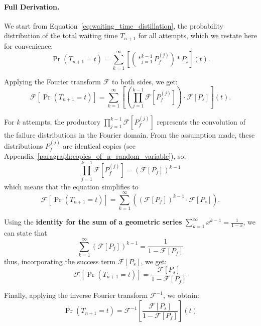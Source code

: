 \documentclass{masterthesis}
\begin{document}
\paragraph*{Full Derivation.}

We start from Equation~\ref{eq:waiting_time_distillation}, the probability distribution of the total waiting time \( T_{n+1} \) for all attempts, which we restate here for convenience:
\begin{equation}
    \Pr(T_{n+1} = t) = \sum_{k=1}^{\infty} \left[ \left(\ast_{j=1}^{k-1} P_f^{(j)} \right) \ast P_s \right](t) .
\end{equation}

Applying the Fourier transform \(\mathcal{F}\) to both sides, we get:
\begin{equation}
    \mathcal{F}[\Pr(T_{n+1} = t)] = \sum_{k=1}^{\infty} \left[ \left(\prod_{j=1}^{k-1} \mathcal{F}[P_f^{(j)}] \right) \cdot \mathcal{F}[P_s] \right](t) .
\end{equation}

For $k$ attempts, the productory \(\prod_{j=1}^{k-1} \mathcal{F}[P_f^{(j)}]\) represents the convolution of the failure distributions in the Fourier domain. From the assumption made, these distributions \( P_f^{(j)} \) are identical copies (see Appendix~\ref{paragraph:copies_of_a_random_variable}), so:
\begin{equation}
    \prod_{j=1}^{k-1} \mathcal{F}[P_f^{(j)}] = \left( \mathcal{F}[P_f] \right)^{k-1}
\end{equation}
which means that the equation simplifies to
\begin{equation}
    \mathcal{F}[\Pr(T_{n+1} = t)] = \sum_{k=1}^{\infty} \left( \left( \mathcal{F}[P_f] \right)^{k-1} \cdot \mathcal{F}[P_s] \right) .
\end{equation}

Using the \textbf{identity for the sum of a geometric series} \(\sum_{k=1}^{\infty} x^{k-1} = \frac{1}{1-x}\), we can state that
\begin{equation}
    \sum_{k=1}^{\infty} \left( \mathcal{F}[P_f] \right)^{k-1} = \frac{1}{1 - \mathcal{F}[P_f]}
\end{equation}
thus, incorporating the success term \(\mathcal{F}[P_s]\), we get:
\begin{equation}
\mathcal{F}[\Pr(T_{n+1} = t)] = \frac{\mathcal{F}[P_s]}{1 - \mathcal{F}[P_f]}
\end{equation}

Finally, applying the inverse Fourier transform \(\mathcal{F}^{-1}\), we obtain:
\begin{equation}
    \Pr(T_{n+1} = t) = \mathcal{F}^{-1} \left[ \frac{\mathcal{F}[P_s]}{1 - \mathcal{F}[P_f]} \right](t)
\end{equation}
\end{document}

